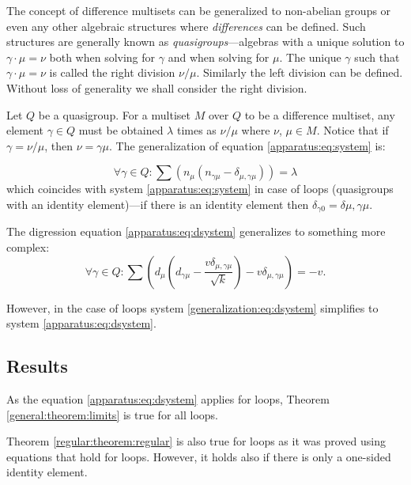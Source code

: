 The concept of difference multisets can be generalized to non-abelian groups or even any other algebraic structures where \emph{differences} can be defined. Such structures are generally known as \emph{quasigroups}---algebras with a unique solution to $\gamma\cdot\mu=\nu$ both when solving for $\gamma$ and when solving for $\mu$. The unique $\gamma$
such that $\gamma\cdot\mu=\nu$ is called the right division $\nu/\mu$. Similarly the left division can be defined.
Without loss of generality we shall consider the right division. 

Let $Q$ be a quasigroup. For a multiset $M$ over $Q$ to be a difference multiset, any element $\gamma\in Q$ must be obtained $\lambda$ times as $\nu/\mu$ where $\nu$, $\mu\in M$. Notice that if $\gamma=\nu/\mu$, then $\nu=\gamma\mu$. The generalization of equation \eqref{apparatus:eq:system} is:

    \begin{equation}
        \label{generalization:eq:system}
        \forall \gamma \in Q \colon \sum (n_\mu(n_{\gamma\mu}-\delta_{\mu,\gamma\mu})) = \lambda
    \end{equation}
which coincides with system \eqref{apparatus:eq:system} in case of loops (quasigroups with an identity element)---if there is an identity element then $\delta_{\gamma0}=\delta{\mu,\gamma\mu}$.

The digression equation \eqref{apparatus:eq:dsystem} generalizes to something more complex:
    \begin{equation}
        \label{generalization:eq:dsystem}
        \forall \gamma \in Q \colon \sum (d_\mu (d_{\gamma\mu}-\frac{v\delta_{\mu,\gamma\mu}}{\sqrt k})-v\delta_{\mu,\gamma\mu}) = -v.
    \end{equation}

However, in the case of loops system \eqref{generalization:eq:dsystem} simplifies to system \eqref{apparatus:eq:dsystem}.

\subsection{Results}

As the equation \eqref{apparatus:eq:dsystem} applies for loops, Theorem \ref{general:theorem:limits} is true for all loops.

Theorem \ref{regular:theorem:regular} is also true for loops as it was proved using equations that hold for loops. However, it holds also if there is only a one-sided identity element.

